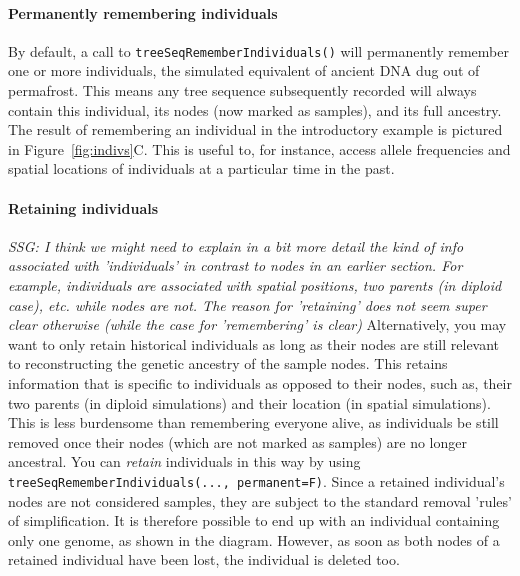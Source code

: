 \documentclass[12pt]{article}
\newcommand{\comment}[1]{\textit{\color{green} #1}}
\begin{document}
\paragraph{Permanently remembering individuals}
By default, a call to \verb|treeSeqRememberIndividuals()|
will permanently remember one or more individuals,
the simulated equivalent of ancient DNA dug out of permafrost.
This means any tree sequence subsequently recorded will always contain this individual,
its nodes (now marked as samples), and its full ancestry.
The result of remembering an individual in the introductory example is pictured
in Figure~\ref{fig:indivs}C.
This is useful to, for instance, access allele frequencies and spatial locations of individuals
at a particular time in the past.

\paragraph{Retaining individuals}
\comment{SSG: I think we might need to explain in a bit more detail the kind of info associated with 'individuals' in contrast to nodes in an earlier section. For example, individuals are associated with spatial positions, two parents (in diploid case), etc. while nodes are not. The reason for 'retaining' does not seem super clear otherwise (while the case for 'remembering' is clear)}
Alternatively, you may want to only retain historical individuals as long as their nodes are still
relevant to reconstructing the genetic ancestry of the sample nodes.
This retains information that is specific to individuals as opposed to their nodes,
such as, their two parents (in diploid simulations) and their location (in spatial simulations).
This is less burdensome than remembering everyone alive, as individuals be still removed once their
nodes (which are not marked as samples) are no longer ancestral.
You can \emph{retain} individuals in this way by using
\verb|treeSeqRememberIndividuals(..., permanent=F)|.
Since a retained individual’s nodes are not considered samples,
they are subject to the standard removal 'rules' of simplification.
It is therefore possible to end up with an individual containing only one genome, as shown in the diagram.
However, as soon as both nodes of a retained individual have been lost,
the individual is deleted too.
\end{document}
